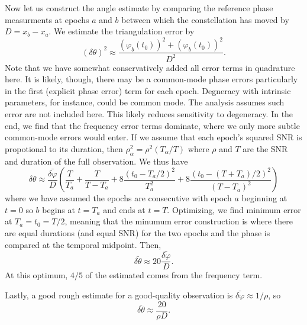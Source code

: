 \documentclass[aps,showpacs,12pt,onecolumn,prd,superscriptaddress,nofootinbib]{revtex4}
\begin{document}
Now let us construct the angle estimate by comparing the reference phase measurments at epochs $a$ and $b$ between which the constellation has moved by $D=x_b-x_a$. We estimate the triangulation error by
$$
\left(\delta\theta\right)^2 \approx \frac{\left(\varphi_b(t_0)\right)^2+\left(\varphi_b(t_0)\right)^2}{D^2}.
$$
Note that we have somewhat conservatively added all error terms in quadrature here. It is likely, though, there may be a common-mode phase errors particularly in the first (explicit phase error) term for each epoch.  Degneracy with intrinsic parameters, for instance, could be common mode.  The analysis assumes such error are not included here.  This likely reduces sensitivity to degeneracy.  In the end, we find that the frequency error terms dominate, where we only more subtle common-mode errors would enter.
If we assume that each epoch's squared SNR is propotional to its duration, then $\rho^2_\alpha=\rho^2(T_\alpha/T)$ where $\rho$ and $T$ are the SNR and duration of the full observation. We thus have
$$
\delta\theta\approx\frac{\bar{\delta\varphi}}{D}\left(\frac{T}{T_a}+\frac{T}{T-T_a} + 8\frac{\left(t_0-T_a/2\right)^2}{T^2_a} +8\frac{\left(t_0-(T+T_a)/2\right)^2}{(T-T_a)^2}\right)
$$
where we have assumed the epochs are consecutive with epoch $a$ beginning at $t=0$ so $b$ begins at $t=T_a$ and ends at $t=T$. Optimizing, we find minimum error at $T_a=t_0=T/2$, meaning that the minumum error construction is where there are equal durations (and equal SNR) for the two epochs and the phase is compared at the temporal midpoint.  Then,
$$
\bar{\delta\theta}\approx20\frac{\bar{\delta\varphi}}{D}.
$$
At this optimum, $4/5$ of the estimated comes from the frequency term.

Lastly, a good rough estimate for a good-quality observation is $\bar{\delta\varphi}\approx 1/\rho$, so
$$
\bar{\delta\theta}\approx\frac{20}{\rho D}.
$$
\end{document}
